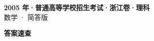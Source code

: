 \documentclass[zihao=-4, a4paper]{ctexart}
\begin{document}
\begin{center}
  {\Large\bfseries 2005 年·普通高等学校招生考试·浙江卷·理科}\\[4pt]
  {\large 数学 · 简答版}
\end{center}
\medskip
{}

\clearpage
{}
\begin{center}{\Large\bfseries 答案速查}\end{center}
\medskip

\end{document}
